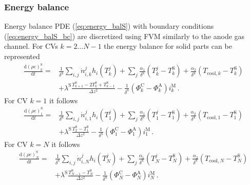 \documentclass[pdftex,a4paper, 12pt]{article}
\begin{document}
\subsubsection*{Energy balance}
%
Energy balance PDE (\ref{eq:energy_balS}) with boundary conditions (\ref{eq:energy_balS_bc}) are discretized using FVM similarly to the anode gas channel. For CVs $k=2 \dots N-1$ the energy balance for solid parts can be represented
%
\begin{align}
	\frac{\mathrm{d} (\rho e)_{k}^{\mathrm{S}}}{\mathrm{d} t} = & \frac{1}{\delta^{\mathrm{S}}} \sum_{i,j} \dot{n}_{i,k}^{j} h_{i}(T_{k}^{j}) + \sum_{j} \frac{\alpha_1}{\delta^{\mathrm{S}}} (T_{k}^{j} - T_{k}^{\mathrm{S}}) + \frac{\alpha_2}{\delta^{\mathrm{S}}} (T_{\mathrm{cool},k} - T_{k}^{\mathrm{S}}) \nonumber \\
	&+ \lambda^{\mathrm{S}} \frac{T_{k+1}^{\mathrm{S}} -2T_{k}^{\mathrm{S}} +T_{k-1}^{\mathrm{S}}}{\Delta z^2} - \frac{1}{\delta^{\mathrm{S}}}  (\mathit{\Phi}_{k}^{\mathrm{C}} - \mathit{\Phi}_{k}^{\mathrm{A}}) i_{k}^{\mathrm{M}} \, .
	\label{eq:energy_balS_disc}
\end{align}
%
%
For CV $k = 1$ it follows
%
\begin{align}
	\frac{\mathrm{d} (\rho e)_{1}^{\mathrm{S}}}{\mathrm{d} t} = & \frac{1}{\delta^{\mathrm{S}}} \sum_{i,j} \dot{n}_{i,1}^{j} h_{i}(T_{1}^{j}) + \sum_{j} \frac{\alpha_1}{\delta^{\mathrm{S}}} (T_{1}^{j} - T_{1}^{\mathrm{S}}) + \frac{\alpha_2}{\delta^{\mathrm{S}}} (T_{\mathrm{cool},1} - T_{1}^{\mathrm{S}}) \nonumber \\
	&+ \lambda^{\mathrm{S}} \frac{T_{2}^{\mathrm{S}} - T_{1}^{\mathrm{S}}}{\Delta z^2} - \frac{1}{\delta^{\mathrm{S}}}  (\mathit{\Phi}_{1}^{\mathrm{C}} - \mathit{\Phi}_{1}^{\mathrm{A}}) i_{1}^{\mathrm{M}} \, .
	\label{eq:energy_balS_disc1}
\end{align}
%
%
For CV $k = N$ it follows
%
\begin{align}
	\frac{\mathrm{d} (\rho e)_{N}^{\mathrm{S}}}{\mathrm{d} t} = & \frac{1}{\delta^{\mathrm{S}}} \sum_{i,j} \dot{n}_{i,N}^{j} h_{i}(T_{N}^{j}) + \sum_{j} \frac{\alpha_1}{\delta^{\mathrm{S}}} (T_{N}^{j} - T_{N}^{\mathrm{S}}) + \frac{\alpha_2}{\delta^{\mathrm{S}}} (T_{\mathrm{cool},N} - T_{N}^{\mathrm{S}}) \nonumber \\
	&+ \lambda^{\mathrm{S}} \frac{T_{N-1}^{\mathrm{S}} - T_{N}^{\mathrm{S}}}{\Delta z^2} - \frac{1}{\delta^{\mathrm{S}}}  (\mathit{\Phi}_{N}^{\mathrm{C}} - \mathit{\Phi}_{N}^{\mathrm{A}}) i_{N}^{\mathrm{M}} \, .
	\label{eq:energy_balS_discN}
\end{align}
%
%
%

%

%
\cleardoublepage
%

%
%
\end{document}
